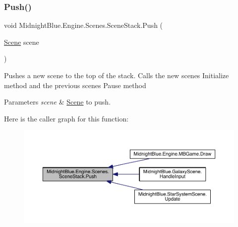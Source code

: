 \subsubsection{\texorpdfstring{Push()}{Push()}}
{\footnotesize\ttfamily void Midnight\+Blue.\+Engine.\+Scenes.\+Scene\+Stack.\+Push (\begin{DoxyParamCaption}\item[{\hyperlink{class_midnight_blue_1_1_engine_1_1_scenes_1_1_scene}{Scene}}]{scene }\end{DoxyParamCaption})\hspace{0.3cm}{\ttfamily [inline]}}



Pushes a new scene to the top of the stack. Calls the new scenes Initialize method and the previous scenes Pause method 


\begin{DoxyParams}{Parameters}
{\em scene} & \hyperlink{class_midnight_blue_1_1_engine_1_1_scenes_1_1_scene}{Scene} to push.\\
\hline
\end{DoxyParams}
Here is the caller graph for this function\+:
\nopagebreak
\begin{figure}[H]
\begin{center}
\leavevmode
\includegraphics[width=350pt]{class_midnight_blue_1_1_engine_1_1_scenes_1_1_scene_stack_ac98c028592de2bbaad1babf63bfa1aa3_icgraph}
\end{center}
\end{figure}
\hypertarget{class_midnight_blue_1_1_engine_1_1_scenes_1_1_scene_stack_a8bddd32efa3f6133aa3899a164160431}{}\label{class_midnight_blue_1_1_engine_1_1_scenes_1_1_scene_stack_a8bddd32efa3f6133aa3899a164160431} 
